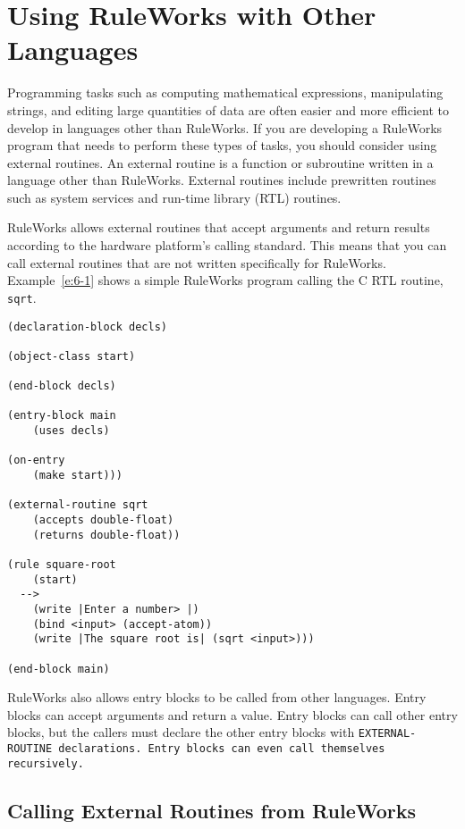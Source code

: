 \chapter{Using RuleWorks with Other Languages}
\label{c:otherlang}

Programming tasks such as computing mathematical expressions,
manipulating strings, and editing large quantities of data are often
easier and more efficient to develop in languages other than
RuleWorks. If you are developing a RuleWorks program that needs to
perform these types of tasks, you should consider using external
routines. An external routine is a function or subroutine written in a
language other than RuleWorks.  External routines include prewritten
routines such as system services and run-time library (RTL) routines.

RuleWorks allows external routines that accept arguments and return
results according to the hardware platform's calling standard. This
means that you can call external routines that are not written
specifically for RuleWorks. Example~\ref{e:6-1} shows a simple
RuleWorks program calling the C RTL routine, \verb|sqrt|.

\begin{exampl}
\begin{verbatim}
(declaration-block decls)

(object-class start)

(end-block decls)

(entry-block main
    (uses decls)

(on-entry
    (make start)))

(external-routine sqrt
    (accepts double-float)
    (returns double-float))

(rule square-root
    (start)
  -->
    (write |Enter a number> |)
    (bind <input> (accept-atom))
    (write |The square root is| (sqrt <input>)))

(end-block main)
\end{verbatim}
\label{e:6-1}
\end{exampl}

RuleWorks also allows entry blocks to be called from other
languages. Entry blocks can accept arguments and return a value. Entry
blocks can call other entry blocks, but the callers must declare the
other entry blocks with \tt{EXTERNAL-ROUTINE} declarations. Entry
blocks can even call themselves recursively.

\section{Calling External Routines from RuleWorks}

